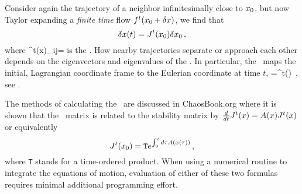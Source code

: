 Consider again the trajectory of a  neighbor infinitesimally close
to ${x_0}$, but now Taylor expanding a \emph{finite time} flow
$f^t({x_0} +\delta x)$, we find that
\[
 \delta x(t) = J^t({x_0})\delta {x_0}
 \,,
\]
where
\beq
\jMps^t(x)_{ij}=
is the \jacobianM. How nearby trajectories separate or approach each other depends on the eigenvectors and eigenvalues of the \jacobianM. In particular, the \jacobianM\ maps the initial, Lagrangian coordinate frame to the Eulerian coordinate at time $t$,
\beq
{}=\jMps^t(\xInit) \velField{\xInit}
\,,
see .

The methods of calculating the \jacobianM\ are discussed in ChaosBook.org where it is shown that the \jacobianM\ matrix is related to the stability matrix by $\frac{d}{dt} \jMps^t(x)=\Mvar (x) \jMps^t(x)$ or equivalently 
\[
\jMps^t(\xInit)= \texttt{T} e^{\int^t_0 d\tau \Mvar (x(\tau))}
 \,,
\]
where \texttt{T} stands for a time-ordered product. When using a numerical routine to integrate the equations of motion, evaluation of either of these two formulas requires minimal additional programming effort.



